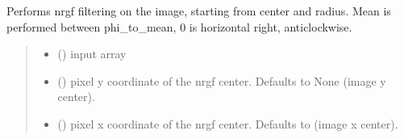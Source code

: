 \documentclass[letterpaper,10pt,english]{sphinxmanual}
\begin{document}
\begin{fulllineitems}
\label{\detokenize{micropolarray.processing:micropolarray.processing.nrgf.nrgf}}
\pysigstartsignatures
{}
\pysigstopsignatures
\sphinxAtStartPar
Performs nrgf filtering on the image, starting from center and radius. Mean is performed between phi\_to\_mean, 0 is horizontal right, anti\sphinxhyphen{}clockwise.
\begin{quote}\begin{description}
\begin{itemize}
\item {} 
\sphinxAtStartPar
{} () \textendash{} input array

\item {} 
\sphinxAtStartPar
{} (\sphinxstyleliteralemphasis{\sphinxupquote{, }}) \textendash{} pixel y coordinate of the nrgf center. Defaults to None (image y center).

\item {} 
\sphinxAtStartPar
{} (\sphinxstyleliteralemphasis{\sphinxupquote{, }}) \textendash{} pixel x coordinate of the nrgf center. Defaults to (image x center).


\end{itemize}
\end{description}
\end{quote}
\end{fulllineitems}
\end{document}

